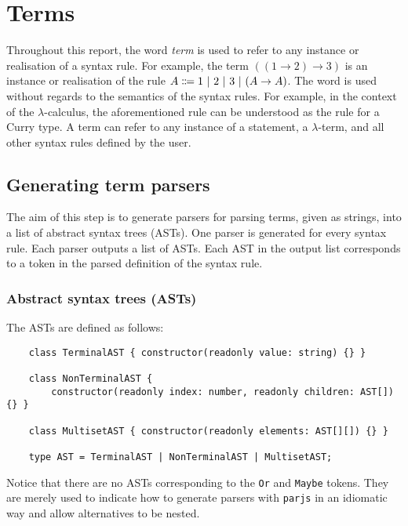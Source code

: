 \chapter{Terms}
\label{chapter:term}
Throughout this report, the word \textit{term} is used to refer to any instance or realisation of a syntax rule. For example, the term $((1 \to 2) \to 3)$ is an instance or realisation of the rule $A \Coloneqq 1 \ |\  2 \ |\  3 \ |\  (A \to A)$. The word is used without regards to the semantics of the syntax rules. For example, in the context of the $\lambda$-calculus, the aforementioned rule can be understood as the rule for a Curry type. A term can refer to any instance of a statement, a $\lambda$-term, and all other syntax rules defined by the user.

\section{Generating term parsers}
The aim of this step is to generate parsers for parsing terms, given as strings, into a list of abstract syntax trees (ASTs). One parser is generated for every syntax rule. Each parser outputs a list of ASTs. Each AST in the output list corresponds to a token in the parsed definition of the syntax rule. 

\subsection{Abstract syntax trees (ASTs)}
The ASTs are defined as follows:
\begin{lstlisting}
    class TerminalAST { constructor(readonly value: string) {} }

    class NonTerminalAST {
        constructor(readonly index: number, readonly children: AST[]) {} }

    class MultisetAST { constructor(readonly elements: AST[][]) {} }

    type AST = TerminalAST | NonTerminalAST | MultisetAST;
\end{lstlisting}
Notice that there are no ASTs corresponding to the \lstinline{Or} and \lstinline{Maybe} tokens. They are merely used to indicate how to generate parsers with \lstinline{parjs} in an idiomatic way and allow alternatives to be nested.

